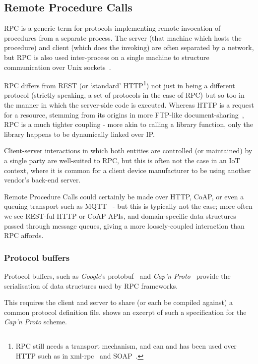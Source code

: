\subsection{Remote Procedure Calls} \label{soln:rpc}
RPC is a generic term for protocols implementing remote invocation of procedures from a separate process. The server (that machine which hosts the procedure) and client (which does the invoking) are often separated by a network, but RPC is also used inter-process on a single machine to structure communication over Unix sockets~\cite{rpc_unix_sockets}.

RPC differs from REST (or `standard' HTTP\footnote{RPC still needs a transport mechanism, and can and has been used over HTTP such as in xml-rpc~\cite{xml-rpc} and SOAP~\cite{ietf-soap-draft}.}) not just in being a different protocol (strictly speaking, a set of protocols in the case of RPC) but so too in the manner in which the server-side code is executed. Whereas HTTP is a request for a resource, stemming from its origins in more FTP-like document-sharing~\cite{http_history, http_vs_ftp}, RPC is a much tighter coupling - more akin to calling a library function, only the library happens to be dynamically linked over IP.

Client-server interactions in which both entities are controlled (or maintained) by a single party are well-suited to RPC, but this is often not the case in an IoT context, where it is common for a client device manufacturer to be using another vendor's back-end server.

Remote Procedure Calls could certainly be made over HTTP, CoAP, or even a queuing transport such as MQTT~\cite{mqtt-rpc} - but this is typically not the case; more often we see REST-ful HTTP or CoAP APIs, and domain-specific data structures passed through message queues, giving a more loosely-coupled interaction than RPC affords.

\subsubsection{Protocol buffers} \label{soln:rpc:protocol-buffers}

Protocol buffers, such as \emph{Google}'s protobuf~\cite{protobuf} and \emph{Cap'n Proto}~\cite{capn_proto} provide the serialisation of data structures used by RPC frameworks.

This requires the client and server to share (or each be compiled against) a common protocol definition file.  shows an excerpt of such a specification for the \emph{Cap'n Proto} scheme.


